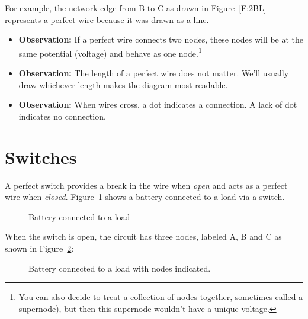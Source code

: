 For example, the network edge from B to C as drawn in Figure~\ref{F:2BL} represents a perfect wire because it was drawn as a line.
\par
\noindent
\begin{itemize}
\item \textbf{Observation:} If a perfect wire connects two nodes, these nodes will be at the same potential (voltage) and behave as one node.\footnote{You can also decide to treat a collection of nodes together, sometimes called a supernode), but then this supernode wouldn't have a unique voltage.} 
\item \textbf{Observation:} The length of a perfect wire does not matter. We'll usually draw whichever length makes the diagram most readable.
\item \textbf{Observation:} When wires cross, a dot indicates a connection. A lack of dot indicates no connection.
\end{itemize}
\section{Switches}
A perfect switch provides a break in the wire when \emph{open} and acts as a perfect wire when \emph{closed}. Figure~\ref{F:2BLa} shows a battery connected to a load via a switch.

\begin{figure}[H]
\begin{center}
\caption{Battery connected to a load}
\label{F:2BLa}
\end{center}
\end{figure}

When the switch is open, the circuit has three nodes, labeled A, B and C as shown in Figure~\ref{F:2BLb}:

\begin{figure}[H]
\begin{center}
\caption{Battery connected to a load with nodes indicated.}
\label{F:2BLb}
\end{center}
\end{figure}

